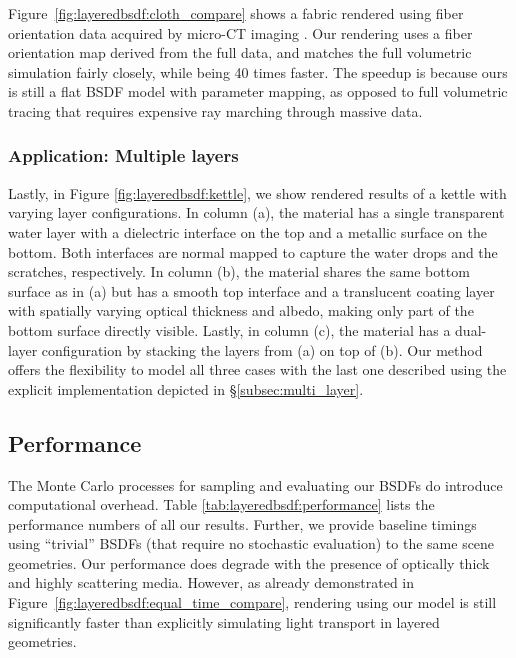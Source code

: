 

Figure~\ref{fig:layeredbsdf:cloth_compare} shows a fabric rendered using fiber orientation data acquired by micro-CT imaging \cite{zhao2011building}. Our rendering uses a fiber orientation map derived from the full data, and matches the full volumetric simulation fairly closely, while being 40 times faster. The speedup is because ours is still a flat BSDF model with parameter mapping, as opposed to full volumetric tracing that requires expensive ray marching through massive data.



\subsubsection{Application: Multiple layers}

Lastly, in Figure \ref{fig:layeredbsdf:kettle}, we show rendered results of a kettle with varying layer configurations.
In column (a), the material has a single transparent water layer with a dielectric interface on the top and a metallic surface on the bottom.
Both interfaces are normal mapped to capture the water drops and the scratches, respectively.
In column (b), the material shares the same bottom surface as in (a) but has a smooth top interface and a translucent coating layer with spatially varying optical thickness and albedo, making only part of the bottom surface directly visible.
Lastly, in column (c), the material has a dual-layer configuration by stacking the layers from (a) on top of (b).
Our method offers the flexibility to model all three cases with the last one described using the explicit implementation depicted in \S\ref{subsec:multi_layer}.



\subsection{Performance}

The Monte Carlo processes for sampling and evaluating our BSDFs do introduce computational overhead.
Table \ref{tab:layeredbsdf:performance} lists the performance numbers of all our results.
Further, we provide baseline timings using ``trivial'' BSDFs (that require no stochastic evaluation) to the same scene geometries.
Our performance does degrade with the presence of optically thick and highly scattering media.
However, as already demonstrated in Figure~\ref{fig:layeredbsdf:equal_time_compare}, rendering using our model is still significantly faster than explicitly simulating light transport in layered geometries.


